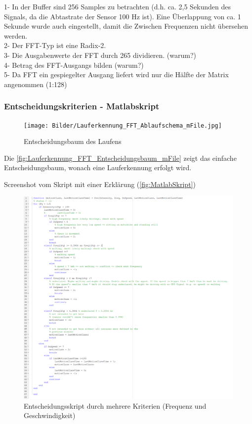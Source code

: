 1-	In der Buffer sind 256 Samples zu betrachten (d.h. ca. 2,5 Sekunden des Signals, da die Abtastrate der Sensor 100 Hz ist). Eine Überlappung von ca. 1 Sekunde wurde auch eingestellt, damit die Zwischen Frequenzen nicht übersehen werden.\\
2-	Der FFT-Typ ist eine Radix-2.\\
3-	Die Ausgabenwerte der FFT durch 265 dividieren. (warum?)\\ %
4-	Betrag des FFT-Ausgangs bilden (warum?)\\ %
5-	Da FFT ein gespiegelter Ausgang liefert wird nur die Hälfte der Matrix angenommen (1:128)\\
\subsubsection{Entscheidungskriterien - Matlabskript}
%
%
%
%
%
\begin{figure}[H]
	\centering
	\texttt{[image: Bilder/Lauferkennung\_FFT\_Ablaufschema\_mFile.jpg]}
	\caption{Entscheidungsbaum des Laufens}
	\label{fig:Lauferkennung_FFT_Entscheidungsbaum_mFile}
\end{figure}

Die \autoref{fig:Lauferkennung_FFT_Entscheidungsbaum_mFile} zeigt das einfache Entscheidungsbaum, wonach eine Lauferkennung erfolgt wird.

Screenshot vom Skript mit einer Erklärung (\autoref{fig:MatlabSkript}) %
\begin{figure}[H]
	\centering
	\includegraphics[width=\linewidth]{Bilder/MatlabSkript.png}
	\caption{Entscheidungsskript durch mehrere Kriterien (Frequenz und Geschwindigkeit)}
	\label{fig:MatlabSkript}
\end{figure}





